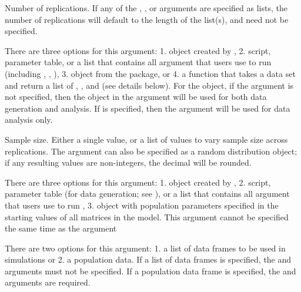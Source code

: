 \documentclass[a4paper]{book}
\begin{document}
\begin{Arguments}
\begin{ldescription}
\item[\code{nRep}] 
Number of replications. If any of the , , or  arguments are specified as lists, the number of replications will default to the length of the list(s), and  need not be specified.

\item[\code{model}] 
There are three options for this argument: 1.  object created by , 2.  script,  parameter table, or a list that contains all argument that users use to run  (including , , ), 3.  object from the  package, or 4. a function that takes a data set and return a list of , , and  (see details below). For the  object, if the  argument is not specified, then the object in the  argument will be used for both data generation and analysis. If  is specified, then the  argument will be used for data analysis only. 

\item[\code{n}] 
Sample size. Either a single value, or a list of values to vary sample size across replications. The  argument can also be specified as a random distribution object; if any resulting values are non-integers, the decimal will be rounded. 

\item[\code{generate}] 
There are three options for this argument: 1.  object created by , 2.  script,  parameter table (for data generation; see ), or a list that contains all argument that users use to run , 3.  object with population parameters specified in the starting values of all matrices in the model. This argument cannot be specified the same time as the  argument

\item[\code{rawData}] 
There are two options for this argument: 1. a list of data frames to be used in simulations or 2. a population data. If a list of data frames is specified, the  and  arguments must not be specified. If a population data frame is specified, the  and  arguments are required.


\end{ldescription}
\end{Arguments}
\end{document}
